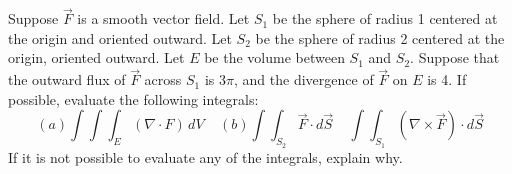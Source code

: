 \documentclass[12pt]{exam}
\begin{document}
\begin{questions}

\question Suppose $\overrightarrow{F}$ is a smooth vector field. Let $S_1$ be the sphere of radius 1 centered at the origin and oriented outward. Let $S_2$ be the sphere of radius 2 centered at the origin, oriented outward. Let $E$ be the volume
between $S_1$ and $S_2$. Suppose that the outward flux of $\overrightarrow{F}$ across $S_1$ is $3\pi$, and the divergence of $\overrightarrow{F}$ on $E$
is 4. If possible, evaluate the following integrals:
    \[ (a) \int\int\int_E(\nabla \cdot F)\, dV \ \ \ \ \ (b) \int\int_{S_2}\overrightarrow{F} \cdot d\overrightarrow{S} \ \ \ \ \ \int\int_{S_1} \left(\nabla \times \overrightarrow{F}\right) \cdot d\overrightarrow{S} \]
    If it is not possible to evaluate any of the integrals, explain why.


\end{questions}
\end{document}

